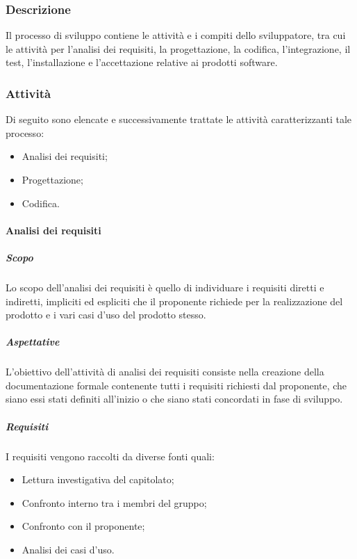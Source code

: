     \subsubsection{Descrizione} \label{subsubsection:Descrizione}
    Il processo di sviluppo contiene le attività e i compiti dello sviluppatore, tra cui le attività per l’analisi dei requisiti, la progettazione, 
    la codifica, l’integrazione, il test, l’installazione e l’accettazione relative ai prodotti software.

    \subsubsection{Attività} \label{subsubsection:Attivita'}
    Di seguito sono elencate e successivamente trattate le attività caratterizzanti tale processo:
    \begin{itemize}
        \item Analisi dei requisiti;
        \item Progettazione;
        \item Codifica.
    \end{itemize}
    
        \paragraph{Analisi dei requisiti} \label{paragraph:Analisi dei requisiti}
            \subparagraph{Scopo}
            Lo scopo dell’analisi dei requisiti è quello di individuare i requisiti diretti e indiretti, impliciti ed espliciti che il proponente richiede 
            per la realizzazione del prodotto e i vari casi d'uso del prodotto stesso.

            \subparagraph{Aspettative} \label{subparagraph:Aspettative}
            L’obiettivo dell’attività di analisi dei requisiti consiste nella creazione della documentazione formale contenente tutti i requisiti 
            richiesti dal proponente, che siano essi stati definiti all'inizio o che siano stati concordati in fase di sviluppo.

            \subparagraph{Requisiti} \label{subparagraph:Requisiti}
            I requisiti vengono raccolti da diverse fonti quali:
            \begin{itemize}
               \item Lettura investigativa del capitolato;
                \item Confronto interno tra i membri del gruppo;
                \item Confronto con il proponente;
                \item Analisi dei casi d'uso.
            \end{itemize}

